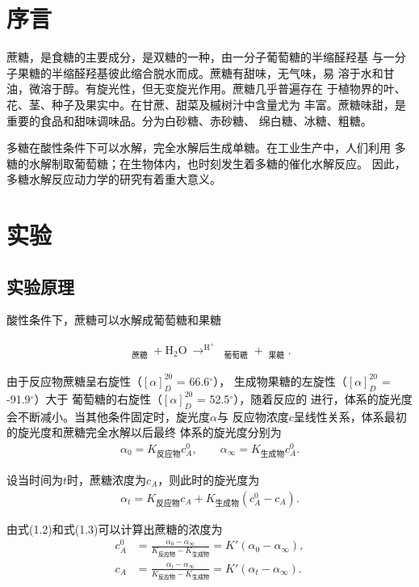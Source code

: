 \documentclass[12pt]{ctexart}
\numberwithin{equation}{section}
\begin{document}
\section{序言}

蔗糖，是食糖的主要成分，是双糖的一种，由一分子葡萄糖的半缩醛羟基
与一分子果糖的半缩醛羟基彼此缩合脱水而成。蔗糖有甜味，无气味，易
溶于水和甘油，微溶于醇。有旋光性，但无变旋光作用。蔗糖几乎普遍存在
于植物界的叶、花、茎、种子及果实中。在甘蔗、甜菜及槭树汁中含量尤为
丰富。蔗糖味甜，是重要的食品和甜味调味品。分为白砂糖、赤砂糖、
绵白糖、冰糖、粗糖。

多糖在酸性条件下可以水解，完全水解后生成单糖。在工业生产中，人们利用
多糖的水解制取葡萄糖；在生物体内，也时刻发生着多糖的催化水解反应。
因此，多糖水解反应动力学的研究有着重大意义。

\section{实验}
\subsection{实验原理}

酸性条件下，蔗糖可以水解成葡萄糖和果糖

\begin{align}
    \mathop{\mathrm{C_{12} H_{22} O_{11}}}_{\text{蔗糖}}
    + \mathrm{H_2 O}
    ~\mathop{\longrightarrow}^{\mathrm{H^+}}~
    \mathop{\mathrm{C_6 H_{12} O_6}}_{\text{葡萄糖}}
    + \mathop{\mathrm{C_6 H_{12} O_6}}_{\text{果糖}}.
\end{align}

由于反应物蔗糖呈右旋性（$[\alpha]^{20}_{D}$ = 66.6$^\circ$），
生成物果糖的左旋性（$[\alpha]^{20}_{D}$ = -91.9$^\circ$）大于
葡萄糖的右旋性（$[\alpha]^{20}_{D}$ = 52.5$^\circ$），随着反应的
进行，体系的旋光度会不断减小。当其他条件固定时，旋光度$\alpha$与
反应物浓度$c$呈线性关系，体系最初的旋光度和蔗糖完全水解以后最终
体系的旋光度分别为
\begin{align}
    \alpha_0 = K_{\text{反应物}}c_{A}^0,
    \qquad
    \alpha_\infty = K_{\text{生成物}}c_{A}^0.
\end{align}

设当时间为$t$时，蔗糖浓度为$c_A$，则此时的旋光度为
\begin{align}
    \alpha_t = K_{\text{反应物}}c_{A} + K_{\text{生成物}}
    (c_A^0 - c_A).
\end{align}

由式(1.2)和式(1.3)可以计算出蔗糖的浓度为
\begin{align}
    c_A^0 &= \frac{\alpha_0 - \alpha_\infty}
        {K_{\text{反应物}} - K_{\text{生成物}}}
    = K'(\alpha_0 - \alpha_\infty), \\
    c_A &= \frac{\alpha_t - \alpha_\infty}
        {K_{\text{反应物}} - K_{\text{生成物}}}
    = K'(\alpha_t - \alpha_\infty).
\end{align}
\end{document}
